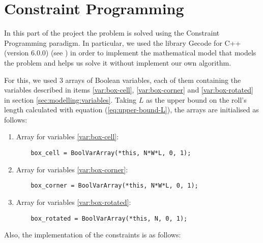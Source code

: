 \section{Constraint Programming}
\label{sec:constraint-programming}

In this part of the project the problem is solved using the Constraint Programming
paradigm. In particular, we used the library Gecode for C++ (version 6.0.0)
(see \cite{GecodeWEB}) in order to implement the mathematical model that models
the problem and helps us solve it without implement our own algorithm.

\hfill

For this, we used 3 arrays of Boolean variables, each of them containing the
variables described in items \ref{var:box-cell}, \ref{var:box-corner} and
\ref{var:box-rotated} in section \ref{sec:modelling:variables}. Taking $L$
as the upper bound on the roll's length calculated with equation
(\ref{eq:upper-bound-L}), the arrays are initialised as follows:

\begin{enumerate}
    \item Array for variables \ref{var:box-cell}:
    
    \begin{lstlisting}
    box_cell = BoolVarArray(*this, N*W*L, 0, 1);
    \end{lstlisting}
    
    \item Array for variables \ref{var:box-corner}:
    
    \begin{lstlisting}
    box_corner = BoolVarArray(*this, N*W*L, 0, 1);
    \end{lstlisting}
    
    \item Array for variables \ref{var:box-rotated}:
    
    \begin{lstlisting}
    box_rotated = BoolVarArray(*this, N, 0, 1);
    \end{lstlisting}
    
\end{enumerate}

Also, the implementation of the constraints is as follows:

